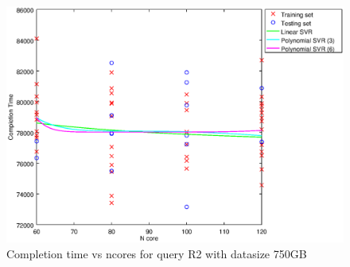 
\begin {figure}[hbtp]
\centering
\includegraphics[width=\textwidth]{output/R2_750_ONLY_1_OVER_NCORES/plot_R2_750_bestmodels.eps}
\caption{Completion time vs ncores for query R2 with datasize 750GB}
\label{fig:all_nonlinear_R2_750}
\end {figure}
